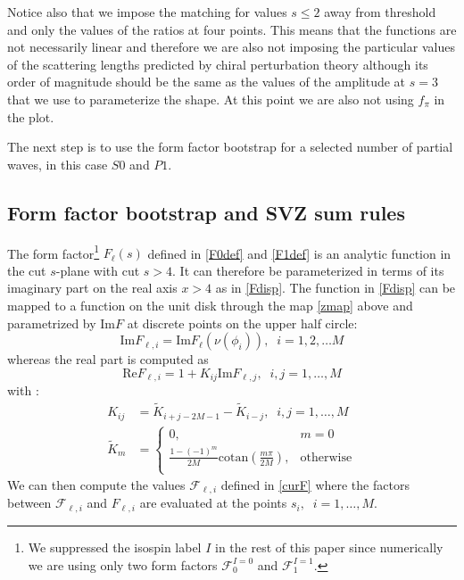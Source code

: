 \documentclass[12pt,letterpaper]{article}
\newcommand{\cotan}{\ensuremath{\mbox{cotan}}}
\begin{document}
Notice also that we impose the matching for values $s\le 2$ away from threshold and only the values of the ratios at four points. This means that the functions are not necessarily linear and therefore we are also not imposing the particular values of the scattering lengths predicted by chiral perturbation theory although its order of magnitude should be the same as the values of the amplitude at $s=3$ that we use to parameterize the shape. At this point we are also not using $f_\pi$ in the plot.  


The next step is to use the form factor bootstrap for a selected number of partial waves, in this case $S0$ and $P1$. 



\subsection{Form factor bootstrap and SVZ sum rules}


 
The form factor\footnote{We suppressed the isospin label $I$ in the rest of this paper since numerically we are using only two form factors $\mathcal{F}^{I=0}_0$ and $\mathcal{F}^{I=1}_1$.} $F_{\ell}(s)$ defined in \eqref{F0def} and \eqref{F1def} is an analytic function in the cut $s$-plane with cut $s>4$. It
can therefore be parameterized in terms of its imaginary part on the real axis $x>4$ as in \eqref{Fdisp}.
 The function in \eqref{Fdisp} can be mapped to a function on the unit disk through the map \eqref{zmap} above and parametrized by $\text{Im}F$ at discrete points on the upper half circle:
\begin{equation}\label{h35}
\text{Im}F_{\ell,i}=\text{Im}F_{\ell}(\nu(\phi_i)),\;\; i=1,2,\ldots M
\end{equation}
whereas the real part is computed as
\begin{equation}\label{h36}
\text{Re}F_{\ell,i}=1+K_{ij}\text{Im}F_{\ell,j},\;\; i,j=1,\ldots,M
\end{equation}
with \cite{He:2018uxa}:
\begin{equation}\label{h37}
	\begin{aligned}
	K_{ij} &=\tilde{K}_{i+j-2M-1}-\tilde{K}_{i-j},\;\; i,j=1,\ldots,M\\
	\tilde{K}_{m}&=\begin{cases}
		0,&m=0\\
		\frac{1-(-1)^m}{2M}\cotan\left(\frac{m\pi}{2M}\right),&\text{otherwise}\\
	\end{cases}
	\end{aligned}
\end{equation}
We can then compute the values $\mathcal{F}_{\ell,i}$ defined in \eqref{curF} where the factors between $\mathcal{F}_{\ell,i}$ and $F_{\ell,i}$ are evaluated at the points $s_i,\;\; i=1,\ldots,M$.
\end{document}
